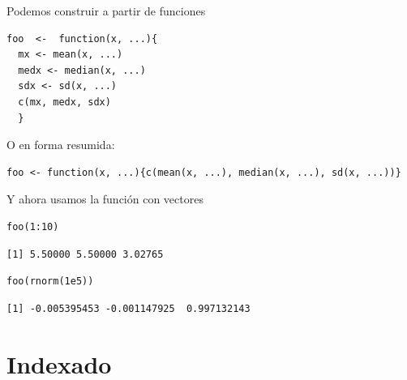 \documentclass[xcolor={usenames,svgnames,dvipsnames}]{beamer}
\begin{document}
\begin{frame}[fragile,label=sec-2-5-2]{Podemos construir a partir de funciones}
 \lstset{language=R,label= ,caption= ,numbers=none}
\begin{lstlisting}
foo  <-  function(x, ...){
  mx <- mean(x, ...)
  medx <- median(x, ...)
  sdx <- sd(x, ...)
  c(mx, medx, sdx)
  }
\end{lstlisting}

O en forma resumida:
\lstset{language=R,label= ,caption= ,numbers=none}
\begin{lstlisting}
foo <- function(x, ...){c(mean(x, ...), median(x, ...), sd(x, ...))}
\end{lstlisting}
\end{frame}


\begin{frame}[fragile,label=sec-2-5-3]{Y ahora usamos la función con vectores}
 \lstset{language=R,label= ,caption= ,numbers=none}
\begin{lstlisting}
foo(1:10)
\end{lstlisting}

\begin{verbatim}
[1] 5.50000 5.50000 3.02765
\end{verbatim}

\lstset{language=R,label= ,caption= ,numbers=none}
\begin{lstlisting}
foo(rnorm(1e5))
\end{lstlisting}

\begin{verbatim}
[1] -0.005395453 -0.001147925  0.997132143
\end{verbatim}
\end{frame}

\section{Indexado}
\label{sec-3}
\end{document}
